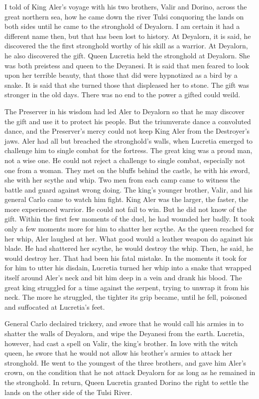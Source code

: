 \documentclass{article}
\begin{document}
I told of King Aler's voyage with his two brothers, Valir and Dorino, across the great northern sea, how he came down the river Tulsi conquoring the lands on both sides until he came to the stronghold of Deyalorn. I am certain it had a different name then, but that has been lost to history. At Deyalorn, it is said, he discovered the the first stronghold worthy of his skill as a warrior. At Deyalorn, he also discovered the gift. Queen Lucretia held the stronghold at Deyalorn. She was both preistess and queen to the Deyanesi. It is said that men feared to look upon her terrible beauty, that those that did were hypnotized as a bird by a snake.  It is said that she turned those that displeased her to stone. The gift was stronger in the old days. There was no end to the power a gifted could weild.

The Preserver in his wisdom had led Aler to Deyalorn so that he may discover the gift and use it to protect his people. But the triumverate dance a convoluted dance, and the Preserver's mercy could not keep King Aler from the Destroyer's jaws. Aler had all but breached the stronghold's walls, when Lucretia emerged to challenge him to single combat for the fortress. The great king was a proud man, not a wise one. He could not reject a challenge to single combat, especially not one from a woman. They met on the bluffs behind the castle, he with his sword, she with her scythe and whip. Two men from each camp came to witness the battle and guard against wrong doing. The king's younger brother, Valir, and his general Carlo came to watch him fight. King Aler was the larger, the faster, the more experienced warrior. He could not fail to win. But he did not know of the gift. Within the first few moments of the duel, he had wounded her badly. It took only a few moments more for him to shatter her scythe. As the queen reached for her whip, Aler laughed at her. What good would a leather weapon do against his blade. He had shattered her scythe, he would destroy the whip. Then, he said, he would destroy her. That had been his fatal mistake. In the moments it took for for him to utter his disdain, Lucretia turned her whip into a snake that wrapped itself around Aler's neck and bit him deep in a vein and drank his blood. The great king struggled for a time against the serpent, trying to unwrap it from his neck. The more he struggled, the tighter its grip became, until he fell, poisoned and suffocated at Lucretia's feet. 

General Carlo declaired trickery, and swore that he would call his armies in to shatter the walls of Deyalorn, and wipe the Deyanesi from the earth. Lucretia, however, had cast a spell on Valir, the king's brother. In love with the witch queen, he swore that he would not allow his brother's armies to attack her stronghold. He went to the youngest of the three brothers, and gave him Aler's crown, on the condition that he not attack Deyalorn for as long as he remained in the stronghold. In return, Queen Lucretia granted Dorino the right to settle the lands on the other side of the Tulsi River. 
\end{document}

